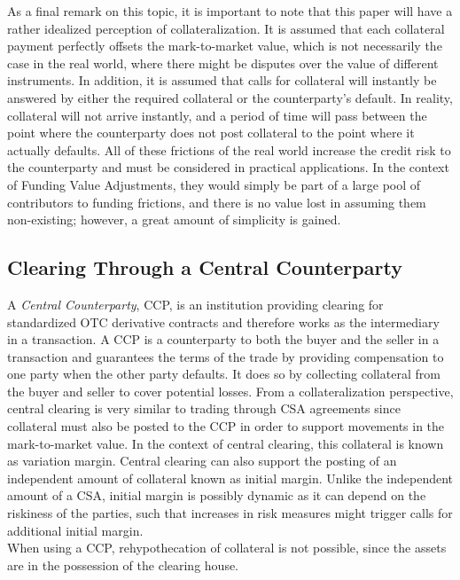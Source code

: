 \documentclass[main.tex]{subfiles}
\begin{document}
        As a final remark on this topic,
        it is important to note that this paper will have a rather idealized perception of collateralization.
        It is assumed that each collateral payment perfectly offsets the mark-to-market value,
        which is not necessarily the case in the real world,
        where there might be disputes over the value of different instruments.
        In addition, it is assumed that calls for collateral will instantly be answered
        by either the required collateral or the counterparty's default. 
        In reality, collateral will not arrive instantly, and a period of time will pass between
        the point where the counterparty does not post collateral to the point where it actually defaults.
        All of these frictions of the real world increase the credit risk to the counterparty
        and must be considered in practical applications. 
        In the context of Funding Value Adjustments, 
        they would simply be part of a large pool of contributors to funding frictions,
        and there is no value lost in assuming them non-existing;
        however, a great amount of simplicity is gained.

    \subsection{Clearing Through a Central Counterparty}
        A \textit{Central Counterparty}, CCP, is an institution
        providing clearing for standardized OTC derivative contracts
        and therefore works as the intermediary in a transaction.
        A CCP is a counterparty to both the buyer and the seller in a transaction 
        and guarantees the terms of the trade by providing compensation to one party when the other party defaults.
        It does so by collecting collateral from the buyer and seller to cover potential losses.
        From a collateralization perspective, central clearing is very similar to trading through CSA agreements
        since collateral must also be posted to the CCP in order to support movements in the mark-to-market value.
        In the context of central clearing, this collateral is known as variation margin.
        Central clearing can also support the posting of an independent amount of collateral 
        known as initial margin.
        Unlike the independent amount of a CSA, initial margin is possibly dynamic 
        as it can depend on the riskiness of the parties, 
        such that increases in risk measures might trigger calls for additional initial margin.
        \\
        When using a CCP, rehypothecation of collateral is not possible,
        since the assets are in the possession of the clearing house.
\end{document}
